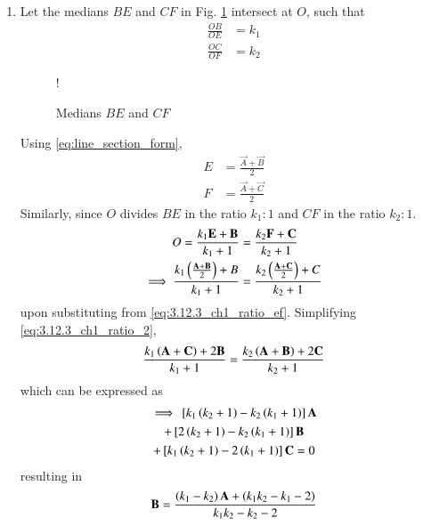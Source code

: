 \renewcommand{\theequation}{\theenumi}
\begin{enumerate}[label=\thesection.\arabic*.,ref=\thesection.\theenumi]
\item Let the medians $BE$ and $CF$ in Fig. \ref{fig:3.12.3_ch1_two_median} intersect at $O$, such that
\begin{equation}
\begin{split}
\frac{OB}{OE} &= k_1
\\
\frac{OC}{OF} &= k_2
\end{split}
\end{equation}
%
\begin{figure}[!h]
\centering
\resizebox {\columnwidth} {!} {

}
\caption{Medians $BE$ and $CF$}
\label{fig:3.12.3_ch1_two_median}
\end{figure}
Using \eqref{eq:line_section_form},
%
\begin{align}
E &= \frac{\vec{A}+\vec{B}}{2} 
\\
F &= \frac{\vec{A}+\vec{C}}{2} 
\label{eq:3.12.3_ch1_ratio_ef}
\end{align}
%
Similarly, since $O$ divides $BE$ in the ratio $k_1:1$ and $CF$ in the ratio $k_2:1$.
\begin{align}
O = \frac{k_1\mathbf{E}+\mathbf{B}}{k_1+1} &=  \frac{k_2\mathbf{F}+\mathbf{C}}{k_2+1} 
\\
\implies \frac{k_1\left(\frac{\mathbf{A}+\mathbf{B}}{2}\right) +B}{k_1+1} &=  \frac{k_2\left(\frac{\mathbf{A}+\mathbf{C}}{2} \right)+C}{k_2+1} 
\label{eq:3.12.3_ch1_ratio_2}
\end{align}
upon substituting from \eqref{eq:3.12.3_ch1_ratio_ef}.
Simplifying \eqref{eq:3.12.3_ch1_ratio_2},
\begin{align}
\frac{k_1\left(\mathbf{A}+\mathbf{C}\right) +2\mathbf{B}}{k_1+1} =  \frac{k_2\left(\mathbf{A}+\mathbf{B}\right)+2\mathbf{C}}{k_2+1} 
\end{align}
which can be expressed as
\begin{multline}
\implies {}\left[k_1\left(k_2+1\right)-k_2\left(k_1+1\right)\right]\mathbf{A}
\\
 +{}\left[2\left(k_2+1\right)-k_2\left(k_1+1\right)\right]\mathbf{B}
\\ +  {}\left[k_1\left(k_2+1\right) -2\left(k_1+1\right)\right]\mathbf{C} = 0
\end{multline}
resulting in 
\begin{align}
\vec{B} = \frac{\brak{k_1-k_2}\vec{A}+\brak{k_1k_2 -k_1 -2}}{k_1k_2 -k_2 -2}

\end{align}
\end{enumerate}
